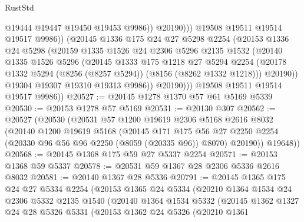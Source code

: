 \begin{lexlean}{RustStd}
\begin{coremodule}
                          @19444
                          @19447
                          @19450
                          @19453
                          @9986))
                      @20190)))
                @19508
                @19511
                @19514
                @19517
                @9986))
            (@20145
              @1336
              @175
              @24
              @27
              @5298
              @2254
              (@20153
                @1336
                @24
                @5298
                (@20159
                  @1335
                  @1526
                  @24
                  @2306
                  @5296
                  @2135
                  @1532
                  (@20140
                    @1335
                    @1526
                    @5296
                    (@20145
                      @1333
                      @175
                      @1218
                      @27
                      @5294
                      @2254
                      (@20178 @1332 @5294 (@8256 (@8257 @5294)) (@8156 (@8262 @1332 @1218)))
                      @20190))
                  @19304
                  @19307
                  @19310
                  @19313
                  @9986))
              @20190)))
        @19508
        @19511
        @19514
        @19517
        @9986))
@20527 := @20145 @1278 @1370 @57 @61 @5169 @5339
@20530 := @20153 @1278 @57 @5169
@20531 := @20130 @307
@20562 := @20527
    (@20530
      (@20531
        @57
        @1200
        @19619
        @2306
        @5168
        @2616
        @8032
        (@20140
          @1200
          @19619
          @5168
          (@20145
            @171
            @175
            @56
            @27
            @2250
            @2254
            (@20330 @96 @56 @96 @2250 (@8059 (@20335 @96)) @8070)
            @20190))
        @19648))
@20568 := @20145 @1368 @175 @59 @27 @5337 @2254
@20571 := @20153 @1368 @59 @5337
@20578 := @20531 @59 @1367 @28 @2306 @5336 @2616 @8032
@20581 := @20140 @1367 @28 @5336
@20791 := @20145
    @1365
    @175
    @24
    @27
    @5334
    @2254
    (@20153
      @1365
      @24
      @5334
      (@20210
        @1364
        @1534
        @24
        @2306
        @5332
        @2135
        @1540
        (@20140
          @1364
          @1534
          @5332
          (@20145
            @1362
            @1327
            @24
            @28
            @5326
            @5331
            (@20153
              @1362
              @24
              @5326
              (@20210
                @1361

\end{coremodule}
\end{lexlean}
